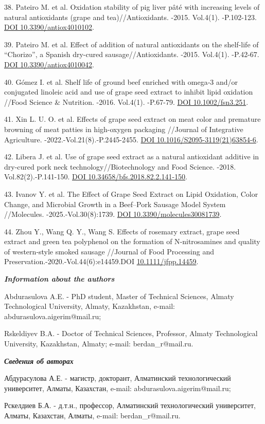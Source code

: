 \begin{refs}
38. Pateiro M. et al. Oxidation stability of pig liver pâté with
increasing levels of natural antioxidants (grape and tea)//Antioxidants.
-2015. Vol.4(1). -P.102-123.
\href{https://doi.org/10.3390/antiox4010102}{DOI 10.3390/antiox4010102}.

39. Pateiro M. et al. Effect of addition of natural antioxidants on the
shelf-life of ``Chorizo'', a Spanish dry-cured sausage//Antioxidants.
-2015. Vol.4(1). -P.42-67.
\href{https://doi.org/10.3390/antiox4010042}{DOI 10.3390/antiox4010042}.

40. Gómez I. et al. Shelf life of ground beef enriched with omega‐3
and/or conjugated linoleic acid and use of grape seed extract to inhibit
lipid oxidation //Food Science \& Nutrition. -2016. Vol.4(1). -P.67-79.
\href{https://doi.org/10.1002/fsn3.251}{DOI 10.1002/fsn3.251}.

41. Xin L. U. O. et al. Effects of grape seed extract on meat color and
premature browning of meat patties in high-oxygen packaging //Journal of
Integrative Agriculture. -2022.-Vol.21(8).-P.2445-2455.
\href{https://doi.org/10.1016/S2095-3119(21)63854-6}{DOI
10.1016/S2095-3119(21)63854-6}.

42. Libera J. et al. Use of grape seed extract as a natural antioxidant
additive in dry-cured pork neck technology//Biotechnology and Food
Science. -2018. Vol.82(2).-P.141-150.
\href{https://doi.org/10.34658/bfs.2018.82.2.141-150}{DOI
10.34658/bfs.2018.82.2.141-150}.

43. Ivanov Y. et al. The Effect of Grape Seed Extract on Lipid
Oxidation, Color Change, and Microbial Growth in a Beef--Pork Sausage
Model System //Molecules. -2025.-Vol.30(8):1739.
\href{https://doi.org/10.3390/molecules30081739}{DOI
10.3390/molecules30081739}.

44. Zhou Y., Wang Q. Y., Wang S. Effects of rosemary extract, grape seed
extract and green tea polyphenol on the formation of N‐nitrosamines and
quality of western‐style smoked sausage //Journal of Food Processing and
Preservation.-2020.-Vol.44(6):e14459.DOI
\href{https://doi.org/10.1111/jfpp.14459}{10.1111/jfpp.14459}.
\end{refs}

\begin{info}
\hspace{1em}\emph{{\bfseries Information about the authors}}

Abdurasulova A.E. - PhD student, Master of Technical Sciences, Almaty
Technological University, Almaty, Kazakhstan, e-mail:
abdurasulova.aigerim@mail.ru;

Rskeldiyev B.A. - Doctor of Technical Sciences, Professor, Almaty
Technological University, Kazakhstan, Almaty; e-mail: berdan\_r@mail.ru.

\hspace{1em}\emph{{\bfseries Сведения об авторах}}

Абдурасулова А.Е. - магистр, докторант, Алматинский технологический
университет, Алматы, Казахстан, e-mail: abdurasulova.aigerim@mail.ru;

Рскелдиев Б.А. - д.т.н., профессор, Алматинский технологический
университет, Алматы, Казахстан, Алматы, e-mail: berdan\_r@mail.ru.
\end{info}
